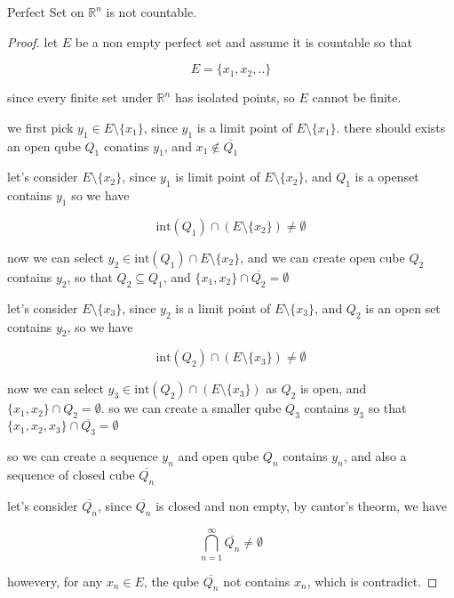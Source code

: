 \documentclass[11pt,a4paper]{article}
\begin{document}
\begin{exercise}
    Perfect Set on $\mathbb{R}^n$ is not countable. 
\end{exercise}

\begin{proof}
    let $E$ be a non empty perfect set and assume it is countable so that

    \[
        E = \{ x_1, x_2, .. \}
    \]

    since every finite set under $\mathbb{R}^n$ has isolated points, so $E$ cannot be finite.

    we first pick $y_1 \in E \setminus \{ x_1 \}$, since $y_1$ is a limit point of $E \setminus \{ x_1 \}$. 
    there should exists an open qube $Q_1$ conatins $y_1$, and $x_1 \notin \overline{Q_1}$

    let's consider $E \setminus \{ x_2 \}$, since $y_1$ is limit point of $E \setminus \{ x_2 \}$, and $Q_1$ is a openset contains $y_1$ so
    we have

    \[
       \text{int}(Q_1) \cap \left( E \setminus \{ x_2 \} \right) \ne \emptyset
    \]

    now we can select $y_2 \in \text{int}(Q_1) \cap E \setminus \{ x_2 \}$, and we can create open cube $Q_2$ contains 
    $y_2$, so that $Q_2 \subseteq Q_1$, and $\{ x_1, x_2 \} \cap \overline{Q_2} = \emptyset$

    let's consider $E \setminus \{ x_3 \}$, since $y_2$ is a limit point of $E \setminus \{ x_3 \}$, and $Q_2$ is an
    open set contains $y_2$, so we have

    \[
       \text{int}(Q_2) \cap \left( E \setminus \{ x_3 \} \right) \ne \emptyset
    \]

    now we can select $y_3 \in \text{int}(Q_2) \cap \left( E \setminus \{ x_3 \} \right)$
    as $Q_2$ is open, and $\{ x_1, x_2 \} \cap Q_2 = \emptyset$. so we can create 
    a smaller qube $Q_3$ contains $y_3$ so that $\{x_1 ,x_2, x_3 \} \cap \overline{Q_3} = \emptyset$

    so we can create a sequence $y_n$ and open qube $Q_n$ contains $y_n$, and also a 
    sequence of closed cube $\overline{Q_n}$

    let's consider $\overline{Q_n}$, since $\overline{Q_n}$ is closed and non empty, by cantor's theorm,
    we have

    \[
        \bigcap_{n=1}^{\infty}\overline{Q_n} \ne \emptyset
    \]

    howevery, for any $x_n \in E$, the qube $\overline{Q_{n}}$ not contains $x_n$,
    which is contradict.
\end{proof}
\end{document}
